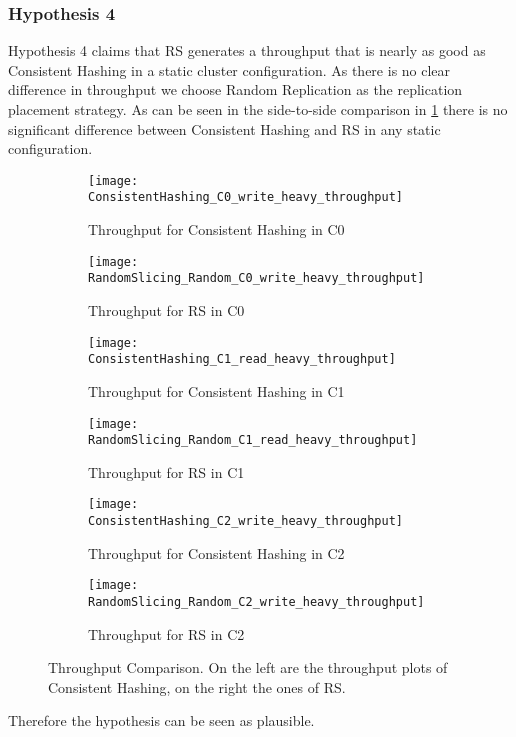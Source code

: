 \subsubsection{Hypothesis 4}
Hypothesis 4 claims that \ac{RS} generates a throughput that is nearly as good as Consistent Hashing in a static cluster configuration.
As there is no clear difference in throughput we choose Random Replication as the replication placement strategy.
As can be seen in the side-to-side comparison in \cref{fig:throughput_comparison} there is no significant difference between Consistent Hashing and \ac{RS} in any static configuration.
\begin{figure}
\begin{subfigure}{0.5\textwidth}
	\texttt{[image: ConsistentHashing\_C0\_write\_heavy\_throughput]}
	\caption[Throughput for Consistent Hashing in C0]{Throughput for Consistent Hashing in C0}
\end{subfigure}
\begin{subfigure}{0.5\textwidth}
	\texttt{[image: RandomSlicing\_Random\_C0\_write\_heavy\_throughput]}
	\caption[Throughput for \ac{RS} in C0]{Throughput for \ac{RS} in C0}
\end{subfigure}
\begin{subfigure}{0.5\textwidth}
	\texttt{[image: ConsistentHashing\_C1\_read\_heavy\_throughput]}
	\caption[Throughput for Consistent Hashing in C1]{Throughput for Consistent Hashing in C1}
\end{subfigure}
\begin{subfigure}{0.5\textwidth}
	\texttt{[image: RandomSlicing\_Random\_C1\_read\_heavy\_throughput]}
	\caption[Throughput for \ac{RS} in C1]{Throughput for \ac{RS} in C1}
\end{subfigure}
\begin{subfigure}{0.5\textwidth}
	\texttt{[image: ConsistentHashing\_C2\_write\_heavy\_throughput]}
	\caption[Throughput for Consistent Hashing in C2]{Throughput for Consistent Hashing in C2}
\end{subfigure}
\begin{subfigure}{0.5\textwidth}
	\texttt{[image: RandomSlicing\_Random\_C2\_write\_heavy\_throughput]}
	\caption[Throughput for \ac{RS} in C2]{Throughput for \ac{RS} in C2}
\end{subfigure}
\caption[Throughput Comparison]{Throughput Comparison. On the left are the throughput plots of Consistent Hashing, on the right the ones of \ac{RS}.}
\label{fig:throughput_comparison}
\end{figure}
Therefore the hypothesis can be seen as plausible.

